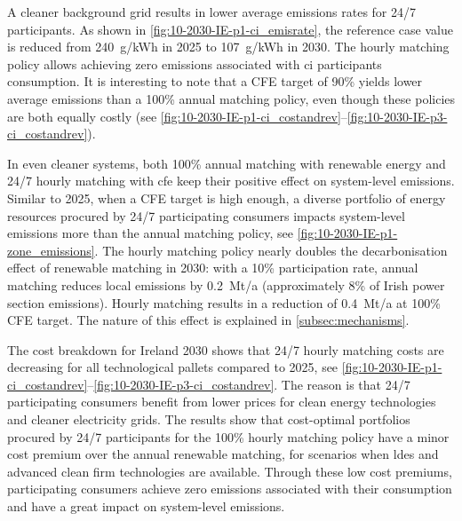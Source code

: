 A cleaner background grid results in lower average emissions rates for 24/7 participants. 
As shown in \cref{fig:10-2030-IE-p1-ci_emisrate}, the reference case value is reduced from 240~g\co/kWh in 2025 to 107~g\co/kWh in 2030.
The hourly matching policy allows achieving zero emissions associated with \gls{ci} participants consumption.
It is interesting to note that a CFE target of 90\% yields lower average emissions than a 100\% annual matching policy, even though these policies are both equally costly (see \cref{fig:10-2030-IE-p1-ci_costandrev}--\cref{fig:10-2030-IE-p3-ci_costandrev}).

In even cleaner systems, both 100\% annual matching with renewable energy and 24/7 hourly matching with \gls{cfe} keep their positive effect on system-level emissions.
Similar to 2025, when a CFE target is high enough, a diverse portfolio of energy resources procured by 24/7 participating consumers impacts system-level emissions more than the annual matching policy, see \cref{fig:10-2030-IE-p1-zone_emissions}.
The hourly matching policy nearly doubles the decarbonisation effect of renewable matching in 2030: with a 10\% participation rate, annual matching reduces local emissions by 0.2~Mt\co/a (approximately 8\% of Irish power section emissions). 
Hourly matching results in a reduction of 0.4~Mt\co/a at 100\% CFE target.
The nature of this effect is explained in \cref{subsec:mechanisms}.

The cost breakdown for Ireland 2030 shows that 24/7 hourly matching costs are decreasing for all technological pallets compared to 2025, see \cref{fig:10-2030-IE-p1-ci_costandrev}--\cref{fig:10-2030-IE-p3-ci_costandrev}.
The reason is that 24/7 participating consumers benefit from lower prices for clean energy technologies and cleaner electricity grids. 
The results show that cost-optimal portfolios procured by 24/7 participants for the 100\% hourly matching policy have a minor cost premium over the annual renewable matching, for scenarios when \gls{ldes} and advanced clean firm technologies are available. 
Through these low cost premiums, participating consumers achieve zero emissions associated with their consumption and have a great impact on system-level \co emissions.



